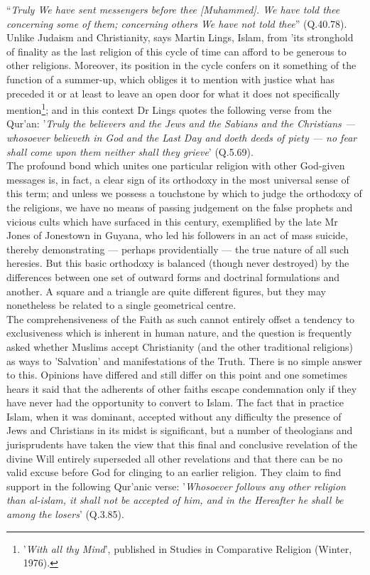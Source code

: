 \documentclass[11pt, b5paper, twoside]{book}
\begin{document}
``\emph{Truly We have sent messengers before thee [Muhammed]. We have told thee concerning some of them; concerning others We have not told thee}'' (Q.40.78). Unlike Judaism and Christianity, says Martin Lings, Islam, from 'its stronghold of finality as the last religion of this cycle of time can afford 
to be generous to other religions. Moreover, its position in the cycle confers on it something of the 
function of a summer-up, which obliges it to mention with justice what has preceded it or at least to 
leave an open door for what it does not specifically mention\footnote{'\emph{With all thy Mind}', published in Studies in Comparative Religion (Winter, 1976).}; and in this context Dr Lings quotes 
the following verse from the Qur'an: '\emph{Truly the believers and the Jews and the Sabians and the 
Christians --- whosoever believeth in God and the Last Day and doeth deeds of piety --- no fear shall 
come upon them neither shall they grieve}' (Q.5.69). \\



The profound bond which unites one particular religion with other God-given messages is, in fact, a 
clear sign of its orthodoxy in the most universal sense of this term; and unless we possess a 
touchstone by which to judge the orthodoxy of the religions, we have no means of passing judgement on 
the false prophets and vicious cults which have surfaced in this century, exemplified by the late Mr 
Jones of Jonestown in Guyana, who led his followers in an act of mass suicide, thereby demonstrating 
--- perhaps providentially --- the true nature of all such heresies. But this basic orthodoxy is balanced 
(though never destroyed) by the differences between one set of outward forms and doctrinal 
formulations and another. A square and a triangle are quite different figures, but they may 
nonetheless be related to a single geometrical centre. \\

The comprehensiveness of the Faith as such cannot entirely offset a tendency to exclusiveness which 
is inherent in human nature, and the question is frequently asked whether Muslims accept Christianity 
(and the other traditional religions) as ways to 'Salvation' and manifestations of the Truth. There 
is no simple answer to this. Opinions have differed and still differ on this point and one sometimes 
hears it said that the adherents of other faiths escape condemnation only if they have never had the 
opportunity to convert to Islam. The fact that in practice Islam, when it was dominant, accepted 
without any difficulty the presence of Jews and Christians in its midst is significant, but a number 
of theologians and jurisprudents have taken the view that this final and conclusive revelation of the 
divine Will entirely superseded all other revelations and that there can be no valid excuse before 
God for clinging to an earlier religion. They claim to find support in the following Qur'anic verse: 
'\emph{Whosoever follows any other religion than al-islam, it shall not be accepted of him, and in the 
Hereafter he shall be among the losers}' (Q.3.85). 
\end{document}
